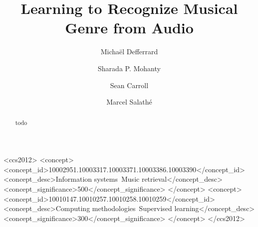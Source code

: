 \documentclass[sigconf]{acmart}
\begin{document}
\title{Learning to Recognize Musical Genre from Audio}


\author{Michaël Defferrard}

\author{Sharada P. Mohanty}

\author{Sean Carroll}

\author{Marcel Salathé}



\begin{abstract}
	todo
\end{abstract}


 \begin{CCSXML}
<ccs2012>
  <concept>
    <concept_id>10002951.10003317.10003371.10003386.10003390</concept_id>
    <concept_desc>Information systems~Music retrieval</concept_desc>
    <concept_significance>500</concept_significance>
  </concept>
  <concept>
    <concept_id>10010147.10010257.10010258.10010259</concept_id>
    <concept_desc>Computing methodologies~Supervised learning</concept_desc>
    <concept_significance>300</concept_significance>
  </concept>
</ccs2012>
\end{CCSXML}

\end{document}
